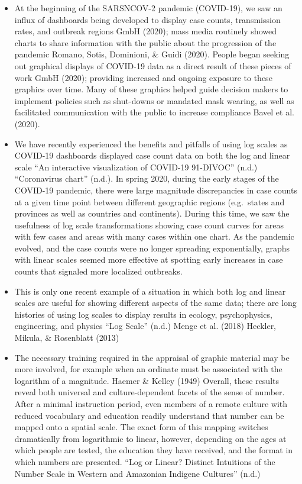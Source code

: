 \documentclass[print]{nuthesis}
\begin{document}
\begin{itemize}
\item
  At the beginning of the SARSNCOV-2 pandemic (COVID-19), we saw an influx of dashboards being developed to display case counts, transmission rates, and outbreak regions GmbH (2020); mass media routinely showed charts to share information with the public about the progression of the pandemic Romano, Sotis, Dominioni, \& Guidi (2020). People began seeking out graphical displays of COVID-19 data as a direct result of these pieces of work GmbH (2020); providing increased and ongoing exposure to these graphics over time. Many of these graphics helped guide decision makers to implement policies such as shut-downs or mandated mask wearing, as well as facilitated communication with the public to increase compliance Bavel et al. (2020).
\item
  We have recently experienced the benefits and pitfalls of using log scales as COVID-19 dashboards displayed
  case count data on both the log and linear scale {``An interactive visualization of {COVID}-19 {{}} 91-{DIVOC}''} (n.d.) {``Coronavirus chart''} (n.d.). In spring 2020, during the early stages of the COVID-19 pandemic, there were large magnitude discrepancies in case counts at a given time point between different geographic regions (e.g.~states and provinces as well as countries and continents). During this time, we saw the usefulness of log scale transformations showing case count curves for areas with few cases and areas with many cases within one chart. As the pandemic evolved, and the case counts were no longer spreading exponentially, graphs with linear scales seemed more effective at spotting early increases in case counts that signaled more localized outbreaks.
\item
  This is only one recent example of a situation in which both log and linear scales are useful for showing different aspects of the same data; there are long histories of using log scales to display results in ecology, psychophysics, engineering, and physics {``Log {Scale}''} (n.d.) Menge et al. (2018) Heckler, Mikula, \& Rosenblatt (2013)
\item
  The necessary training required in the appraisal of graphic material may be more involved, for example when an ordinate must be associated with the logarithm of a magnitude. Haemer \& Kelley (1949)
  Overall, these results reveal both universal and culture-dependent facets of the sense of number. After a minimal instruction period, even members of a remote culture with reduced vocabulary and education readily understand that number can be mapped onto a spatial scale. The exact form of this mapping switches dramatically from logarithmic to linear, however, depending on the ages at which people are tested, the education they have received, and the format in which numbers are presented. {``Log or {Linear}? {Distinct} {Intuitions} of the {Number} {Scale} in {Western} and {Amazonian} {Indigene} {Cultures}''} (n.d.)

\end{itemize}
\end{document}
